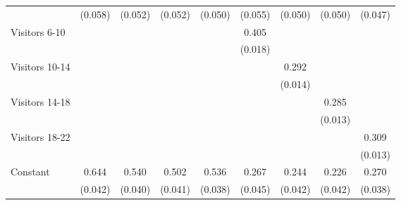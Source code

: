 {\begin{tabular}{l*{8}{c}}
                    &     (0.058)         &     (0.052)         &     (0.052)         &     (0.050)         &     (0.055)         &     (0.050)         &     (0.050)         &     (0.047)         \\
Visitors 6-10       &                     &                     &                     &                     &       0.405\sym{***}&                     &                     &                     \\
                    &                     &                     &                     &                     &     (0.018)         &                     &                     &                     \\
Visitors 10-14      &                     &                     &                     &                     &                     &       0.292\sym{***}&                     &                     \\
                    &                     &                     &                     &                     &                     &     (0.014)         &                     &                     \\
Visitors 14-18      &                     &                     &                     &                     &                     &                     &       0.285\sym{***}&                     \\
                    &                     &                     &                     &                     &                     &                     &     (0.013)         &                     \\
Visitors 18-22      &                     &                     &                     &                     &                     &                     &                     &       0.309\sym{***}\\
                    &                     &                     &                     &                     &                     &                     &                     &     (0.013)         \\
Constant            &       0.644\sym{***}&       0.540\sym{***}&       0.502\sym{***}&       0.536\sym{***}&       0.267\sym{***}&       0.244\sym{***}&       0.226\sym{***}&       0.270\sym{***}\\
                    &     (0.042)         &     (0.040)         &     (0.041)         &     (0.038)         &     (0.045)         &     (0.042)         &     (0.042)         &     (0.038)         \\

\end{tabular}}
